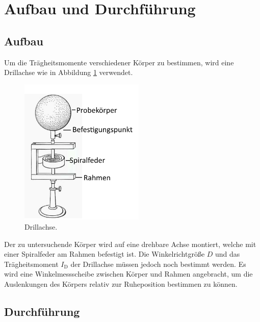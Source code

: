 \section{Aufbau und Durchführung}
\label{sec:Durchführung}
\subsection{Aufbau}
Um die Trägheitsmomente verschiedener Körper zu bestimmen, wird eine Drillachse wie in Abbildung \ref{df:1} verwendet.

\begin{figure}
  \centering
  \includegraphics[height=7cm]{Aufbau.png}
  \caption{Drillachse.\cite{sample}}
  \label{df:1}
\end{figure}

Der zu untersuchende Körper wird auf eine drehbare Achse montiert, welche mit einer Spiralfeder am Rahmen befestigt ist.
Die Winkelrichtgröße $D$ und das Trägheitsmoment $I_{\text{D}}$ der Drillachse müssen jedoch noch bestimmt werden.
Es wird eine Winkelmessscheibe zwischen Körper und Rahmen angebracht, um die Auslenkungen des Körpers relativ zur Ruheposition bestimmen zu können.

\subsection{Durchführung}


